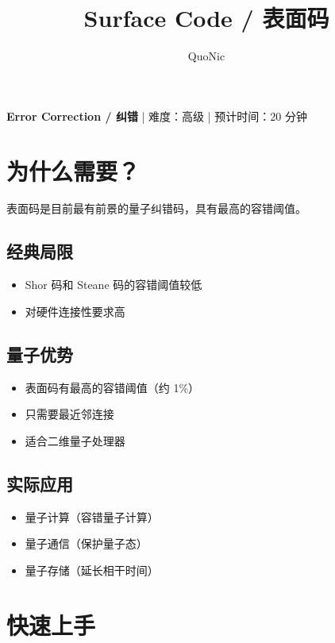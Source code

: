 \documentclass[12pt,a4paper]{article}
\title{Surface Code / 表面码}
\author{QuoNic}
\date{}
\begin{document}
\maketitle

\begin{center}
\textbf{Error Correction / 纠错} | 难度：高级 | 预计时间：20 分钟
\end{center}

\tableofcontents
\newpage

\section{为什么需要？}

表面码是目前最有前景的量子纠错码，具有最高的容错阈值。

\subsection{经典局限}
\begin{itemize}
  \item Shor 码和 Steane 码的容错阈值较低
  \item 对硬件连接性要求高
\end{itemize}

\subsection{量子优势}
\begin{itemize}
  \item 表面码有最高的容错阈值（约 1\%）
  \item 只需要最近邻连接
  \item 适合二维量子处理器
\end{itemize}

\subsection{实际应用}
\begin{itemize}
  \item 量子计算（容错量子计算）
  \item 量子通信（保护量子态）
  \item 量子存储（延长相干时间）
\end{itemize}

\section{快速上手}
\end{document}
